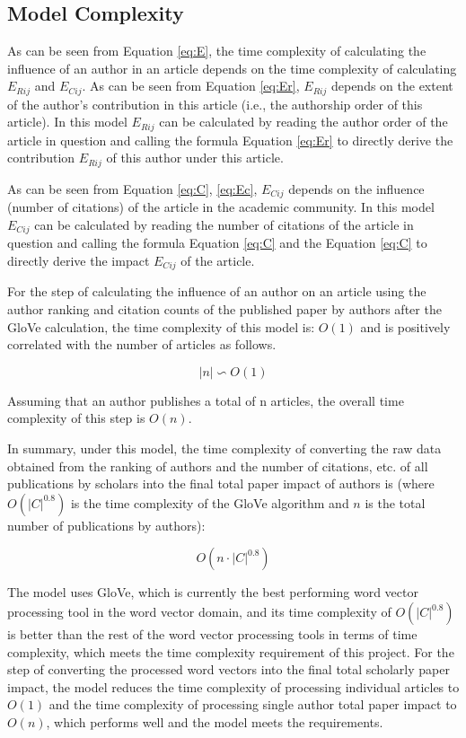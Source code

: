 \documentclass[a4paper]{jpconf}
\begin{document}
\subsection{Model Complexity}
As can be seen from Equation \ref{eq:E}, the time complexity of calculating the influence of an author in an article depends on the time complexity of calculating 
\(E_{Rij}\) and \(E_{Cij}\). As can be seen from
Equation \ref{eq:Er}, \(E_{Rij}\) depends on the extent of the author's
contribution in this article (i.e., the authorship order of this
article). In this model \(E_{Rij}\) can be calculated by reading the
author order of the article in question and calling the formula
Equation \ref{eq:Er} to directly derive the contribution \(E_{Rij}\) of
this author under this article.

As can be seen from Equation \ref{eq:C}, \ref{eq:Ec},
\(E_{Cij}\) depends on the influence (number of citations) of the
article in the academic community. In this model \(E_{Cij}\) can be
calculated by reading the number of citations of the article in question
and calling the formula Equation \ref{eq:C} and the
Equation \ref{eq:C} to directly derive the impact \(E_{Cij}\) of the
article.

For the step of calculating the influence of an author on an article
using the author ranking and citation counts of the published paper
by authors after the GloVe calculation, the time complexity of this
model is: \(O(1)\) and is positively correlated with the number of
articles as follows.

\begin{equation}\label{eq:complexity}
    \mid n \mid \backsim O(1)
\end{equation}

Assuming that an author publishes a total of n articles, the overall
time complexity of this step is \(O(n)\).

In summary, under this model, the time complexity of converting the raw
data obtained from the ranking of authors and the number of citations,
etc. of all publications by scholars into the final total paper
impact of authors is (where \(O(|C|^{0.8})\) is the time complexity of
the GloVe algorithm and \(n\) is the total number of publications by
authors):

\begin{equation}\label{eq:complexity2}
    O(n \cdot |C|^{0.8})
\end{equation}

The model uses GloVe, which is currently the best performing word vector
processing tool in the word vector domain, and its time complexity of
\(O(|C|^{0.8})\) is better than the rest of the word vector processing
tools in terms of time complexity, which meets the time complexity
requirement of this project. For the step of converting the processed
word vectors into the final total scholarly paper impact, the model
reduces the time complexity of processing individual articles to
\(O(1)\) and the time complexity of processing single author total
paper impact to \(O(n)\), which performs well and the model meets
the requirements.
\end{document}
